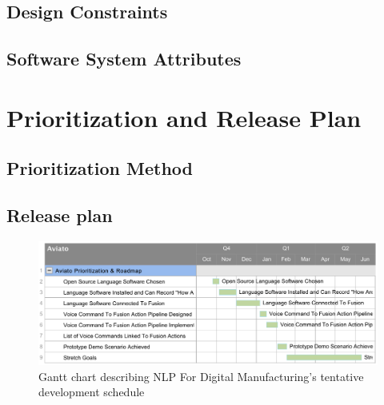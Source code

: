 \documentclass[onecolumn, draftclsnofoot,10pt, compsoc]{IEEEtran}
\def \CapstoneProjectName{NLP For Digital Manufacturing}
\begin{document}
    \subsection{Design Constraints}
    \subsection{Software System Attributes}


\section{Prioritization and Release Plan}
    \subsection{Prioritization Method}
    \subsection{Release plan}
    	\begin{figure}[H]
    		\includegraphics[width=1\textwidth]{ganttChart.png}
    		\centering
    		\caption{Gantt chart describing \CapstoneProjectName's tentative development schedule}
   			\label{fig:mesh1}
    	\end{figure}


% 
%
\end{document}
